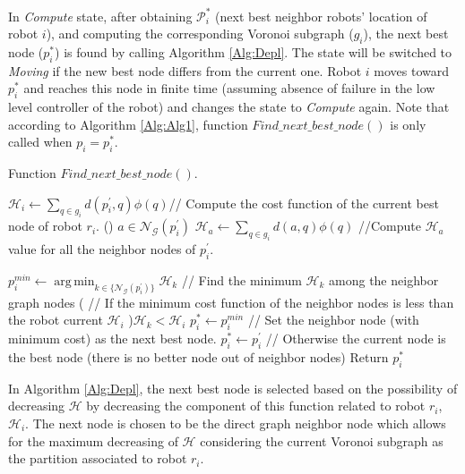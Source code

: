 \documentclass[smallcondensed]{svjour3}
\DeclareMathOperator*{\argmin}{arg\,min}
\begin{document}
In \textit{Compute} state, after obtaining $\mathcal{P}_i^*$ (next best neighbor robots' location of robot $i$), and computing the corresponding Voronoi subgraph ($g_i$), the next best node ($p_i^*$) is found by calling Algorithm \ref{Alg:Depl}. The state will be switched to \textit{Moving} if the new best node differs from the current one. Robot $i$ moves toward $p_i^*$ and reaches this node in finite time (assuming absence of failure in the low level controller of the robot) and changes the state to \textit{Compute} again. 
%
Note that according to Algorithm \ref{Alg:Alg1}, function $Find\_next\_best\_node()$ is only called when $p_i=p_i^*$.\\   
%
\begin{algorithm}[h]
\caption{Function $Find\_next\_best\_node()$. }
\label{Alg:Depl}
\SetAlgoVlined
\DontPrintSemicolon
{}
%
   \nl $\mathcal{H}_i \gets \sum_{q \in g_i} d(p_i^\prime,q)\phi(q)${\color{blue}// Compute the cost function of the current best node of robot $r_i$. }\;
   \nl \ForEach() {$a \in \mathcal{N}_{\mathcal G}(p_i^\prime)$}	
		{	
			$\mathcal{H}_a \gets \sum_{q \in g_i} d(a,q)\phi(q)$ 	{ \color{blue}//Compute $\mathcal{H}_a$ value for all the neighbor nodes of $p_i^\prime$.}\;
		}
			
   \nl $p_i^{min} \gets  \argmin_{k \in \{\mathcal{N}_{\mathcal G}(p_i^\prime) \} } \mathcal{H}_k$ { \color{blue}// Find the minimum $\mathcal{H}_k$ among the neighbor graph nodes} \; %
	\nl \If ({\color{blue} // If the minimum cost function of the neighbor nodes is less than the robot current $\mathcal{H}_i$ }\color{black}){$\mathcal{H}_k <  \mathcal{H}_i$}
	{
		\nl $p_i^* \gets p_i^{min}$ {\color{blue}// Set the neighbor node (with minimum cost) as the next best node.}\;
	}
	\Else
	{
		\nl $p_i^* \gets p_i^\prime$ {\color{blue}// Otherwise the current node is the best node (there is no better node out of neighbor nodes)}\;
	}
   \nl Return $p_i^*$ \;
\end {algorithm}
%

In Algorithm \ref{Alg:Depl}, the next best node is selected based on the possibility of decreasing $\mathcal{H}$ by decreasing the component of this function related to robot $r_i$, $\mathcal{H}_i$. The next node is chosen to be the direct graph neighbor node which allows for the maximum decreasing of $\mathcal H$ considering the current Voronoi subgraph as the partition associated to robot $r_i$.
\end{document}
